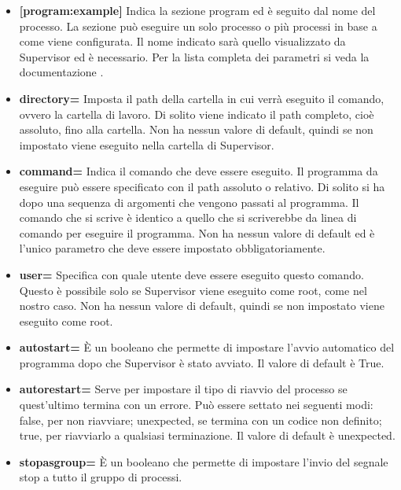 \begin{itemize}
	\item \textbf{[program:example]}\newline
	Indica la sezione program ed è seguito dal nome del processo.
	La sezione può eseguire un solo processo o più processi in base a come viene configurata. 
	Il nome indicato sarà quello visualizzato da Supervisor ed è necessario. 
	Per la lista completa dei parametri si veda la documentazione \cite{client-supervisor-program}.
	\item \textbf{directory=}\newline
	Imposta il path della cartella in cui verrà eseguito il comando, ovvero la cartella di lavoro.
	Di solito viene indicato il path completo, cioè assoluto, fino alla cartella.
	Non ha nessun valore di default, quindi se non impostato viene eseguito nella cartella di Supervisor.
	\item \textbf{command=}\newline
	Indica il comando che deve essere eseguito.
	Il programma da eseguire può essere specificato con il path assoluto o relativo.
	Di solito si ha dopo una sequenza di argomenti che vengono passati al programma.
	Il comando che si scrive è identico a quello che si scriverebbe da linea di comando per eseguire il programma.
	Non ha nessun valore di default ed è l'unico parametro che deve essere impostato obbligatoriamente.
	\item \textbf{user=}\newline
	Specifica con quale utente deve essere eseguito questo comando.
	Questo è possibile solo se Supervisor viene eseguito come root, come nel nostro caso.
	Non ha nessun valore di default, quindi se non impostato viene eseguito come root.
	\item \textbf{autostart=}\newline
	È un booleano che permette di impostare l'avvio automatico del programma dopo che Supervisor è stato avviato.
	Il valore di default è True.
	\item \textbf{autorestart=}\newline
	Serve per impostare il tipo di riavvio del processo se quest'ultimo termina con un errore.
	Può essere settato nei seguenti modi: false, per non riavviare; 
	unexpected, se termina con un codice non definito; 
	true, per riavviarlo a qualsiasi terminazione.
	Il valore di default è unexpected.
	\item \textbf{stopasgroup=}\newline
	È un booleano che permette di impostare l'invio del segnale stop a tutto il gruppo di processi.

\end{itemize}
